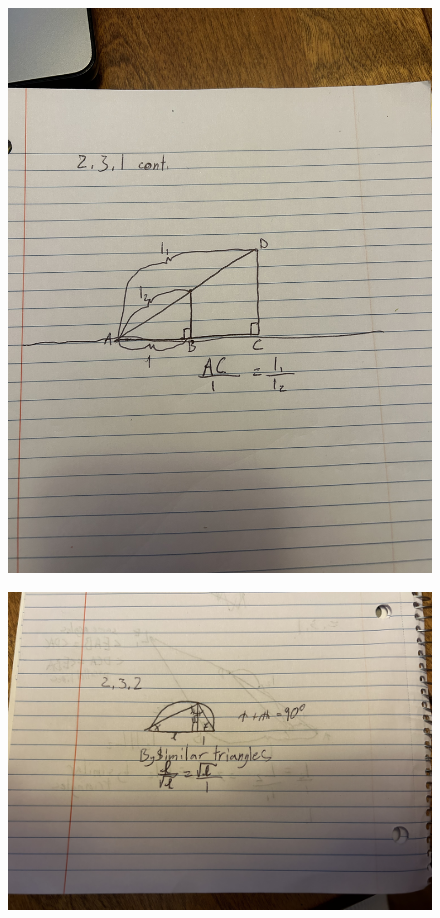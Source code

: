 \documentclass[10pt]{article}
\begin{document}
\begin{enumerate}
\begin{figure}
    \end{figure}
    \begin{figure}
        \includegraphics[scale=0.15]{IMG_0675}
    \end{figure}
    \begin{figure}
        \includegraphics[scale=0.1]{IMG_0676}

\end{figure}
\end{enumerate}
\end{document}
